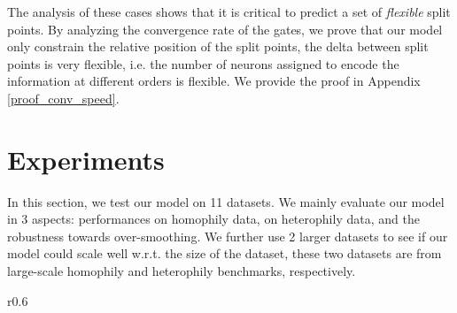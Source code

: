 \documentclass{article}
\begin{document}
The analysis of these cases shows that it is critical to predict a set of \textit{flexible} split points. By analyzing the convergence rate of the gates, we prove that our model only constrain the relative position of the split points, the delta between split points is very flexible, i.e. the number of neurons assigned to encode the information at different orders is flexible. We provide the proof in Appendix \ref{proof_conv_speed}.






\section{Experiments}
\label{part.Experiments}
In this section, we test our model on 11 datasets. We mainly evaluate our model in 3 aspects: performances on homophily data, on heterophily data, and the robustness towards over-smoothing. We further use 2 larger datasets to see if our model could scale well w.r.t. the size of the dataset, these two datasets are from large-scale homophily and heterophily benchmarks, respectively.


\begin{wraptable}{r}{0.6\textwidth}
\vspace{-0.5cm}
\caption{Dataset statistics.}
\label{table.dataset_stats}
\centering
\vspace{0.1cm}
\vspace{-0.2cm}
\end{wraptable}
\end{document}
